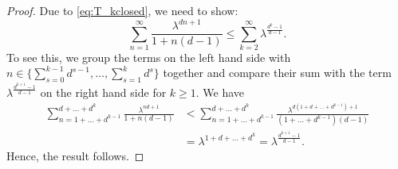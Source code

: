 \documentclass[12pt]{report}
\begin{document}
\begin{proof}
Due to \eqref{eq:T_kclosed}, we need to show:
$$
\sum_{n=1}^{\infty} \frac{\lambda^{dn+1}}{1 + n(d-1)}
\leq
\sum_{k=2}^{\infty} \lambda^{\frac{d^k-1}{d-1}}.
$$
To see this, we group the terms on the left hand side with\newline $n \in \{\sum_{s=0}^{k-1} d^{s-1},\dots,\sum_{s=1}^k d^s\}$ together and compare their sum 
with the term $\lambda^{\frac{d^{k+1}-1}{d-1}}$ on the right hand side for $k \geq 1$.
We have
\begin{align*}
\sum_{n=1+\dots + d^{k-1}}^{d+\dots+d^k} \frac{\lambda^{nd+1}}{1+n(d-1)}
&<
\sum_{n=1+\dots + d^{k-1}}^{d+\dots+d^k} \frac{\lambda^{d (1+d+\dots+d^{k-1}) + 1}}{(1+\dots+d^{k-1})(d-1)}\\
&= \lambda ^{1 + d + \dots + d^k} = \lambda^{\frac{d^{k+1}-1}{d-1}}.
\end{align*}
Hence, the result follows. 

\end{proof}
\end{document}
